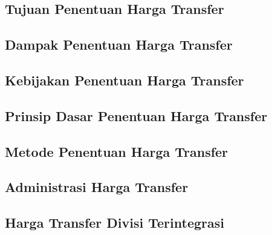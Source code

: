 \subsection{Tujuan Penentuan Harga Transfer}
\subsection{Dampak Penentuan Harga Transfer}
\subsection{Kebijakan Penentuan Harga Transfer}
\subsection{Prinsip Dasar Penentuan Harga Transfer}
\subsection{Metode Penentuan Harga Transfer}
\subsection{Administrasi Harga Transfer}
\subsection{Harga Transfer Divisi Terintegrasi}
